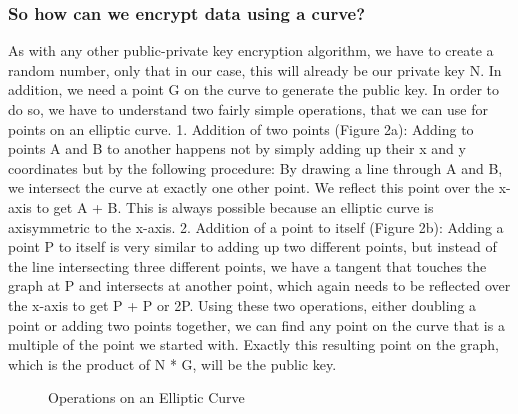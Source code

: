 \subsubsection{So how can we encrypt data using a curve?}
As with any other public-private key encryption algorithm, we have to create a random number, only that in our case, this will already be our private key N. In addition, we need a point G on the curve to generate the public key. In order to do so, we have to understand two fairly simple operations, that we can use for points on an elliptic curve.
1. Addition of two points (Figure 2a): Adding to points A and B to another happens not by simply adding up their x and y coordinates but by the following procedure: By drawing a line through A and B, we intersect the curve at exactly one other point. We reflect this point over the x-axis to get A + B. This is always possible because an elliptic curve is axisymmetric to the x-axis.
2. Addition of a point to itself (Figure 2b): Adding a point P to itself is very similar to adding up two different points, but instead of the line intersecting three different points, we have a tangent that touches the graph at P and intersects at another point, which again needs to be reflected over the x-axis to get P + P or 2P.
Using these two operations, either doubling a point or adding two points together, we can find any point on the curve that is a multiple of the point we started with. Exactly this resulting point on the graph, which is the product of N * G, will be the public key.

\begin{figure}%
    \centering
    \qquad
\caption{Operations on an Elliptic Curve}%
\end{figure}

